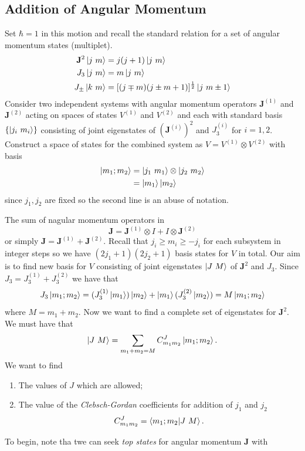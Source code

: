 \documentclass{article}
\begin{document}
\subsection{Addition of Angular Momentum}
Set $ \hbar = 1 $ in this motion and recall the standard relation for a set of angular momentum states (multiplet).
\begin{align*}
	\mathbf J^2 \ket{j\ m} &= j(j+1) \ket{j\ m} \\
	J_3 \ket{j\ m} &= m \ket{j\ m} \\
	J_\pm \ket{k\ m} &= [(j\mp m)(j\pm m +1 )]^{\frac 12}\ket{j \ m\pm 1}
\end{align*}
Consider two independent systems with angular momentum operators  $ \mathbf J^{(1)} $ and $ \mathbf J^{(2)} $ acting on spaces of states $ V^{(1)} $ and $ V^{(2)} $ and each with standard basis $ \{\ket{j_i\ m_i}\} $ consisting of joint eigenstates of $ (\mathbf J^{(i)})^2 $ and $ J_3^{(i)} $ for $ i=1,2 $. Construct a space of states for the combined system as $ V = V^{(1)}\otimes V^{(2)} $ with basis 
\begin{align*}
	\ket{m_1; m_2} &= \ket{j_1\ m_1} \otimes \ket{j_2\ m_2}\\
		       &= \ket{m_1}\ket{m_2}
\end{align*}
since $ j_1,j_2 $ are fixed so the second line is an abuse of notation.\par
The sum of nagular momentum operators in
\[
	\mathbf J = \mathbf J^{(1)}\otimes I + I \otimes \mathbf J^{(2)}
\]
or simply $ \mathbf J = \mathbf J^{(1)} + \mathbf J^{(2)} $. Recall that $ j_i \ge m_i \ge -j_i $ for each subsystem in integer steps so we have $ (2j_1+1)(2j_2+1) $ basis states for $ V $ in total. Our aim is to find new basis for $ V $ consisting of joint eigenstates $ \ket{J\ M} $ of $ \mathbf J^2 $ and $ J_3 $. Since $ J_3 = J_3^{(1)} + J_3^{(2)} $ we have that 
\[
	J_3 \ket{m_1; m_2} = (J_3^{(1)}\ket {m_1})\ket{m_2} + \ket{m_1}(J_3^{(2)} \ket{m_2}) = M\ket{m_1;m_2}
\]
where $ M = m_1 + m_2 $. Now we want to find a complete set of eigenstates for $ \mathbf J^2 $. We must have that
\[
	\ket{J\ M} = \sum_{m_1+ m_2 = M} C^J_{m_1m_2}\ket{m_1;m_2}.
\]
We want to find 
\begin{enumerate}
	\item The values of $ J $ which are allowed;
	\item The value of the \textit{Clebsch-Gordan} coefficients for addition of $ j_1 $ and $ j_2 $
		\[
			C_{m_1m_2}^J= \bra{m_1;m_2}\ket{J\ M}.
		\]
\end{enumerate}
To begin, note tha twe can seek \textit{top states} for angular momentum $ \mathbf J $ with
\end{document}
